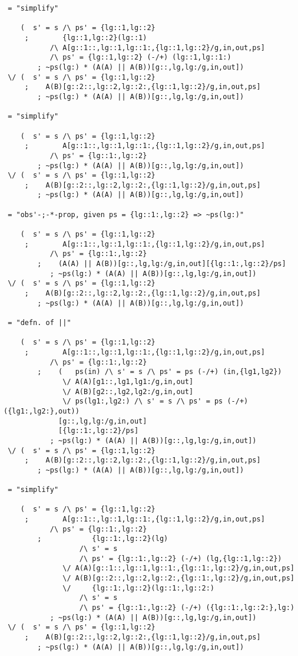 \begin{verbatim}
 = "simplify"

    (  s' = s /\ ps' = {lg::1,lg::2}
     ;        {lg::1,lg::2}(lg::1)
           /\ A[g::1::,lg::1,lg::1:,{lg::1,lg::2}/g,in,out,ps]
           /\ ps' = {lg::1,lg::2} (-/+) (lg::1,lg::1:)
        ; ~ps(lg:) * (A(A) || A(B))[g::,lg,lg:/g,in,out])
 \/ (  s' = s /\ ps' = {lg::1,lg::2}
     ;    A(B)[g::2::,lg::2,lg::2:,{lg::1,lg::2}/g,in,out,ps]
        ; ~ps(lg:) * (A(A) || A(B))[g::,lg,lg:/g,in,out])

 = "simplify"

    (  s' = s /\ ps' = {lg::1,lg::2}
     ;        A[g::1::,lg::1,lg::1:,{lg::1,lg::2}/g,in,out,ps]
           /\ ps' = {lg::1:,lg::2}
        ; ~ps(lg:) * (A(A) || A(B))[g::,lg,lg:/g,in,out])
 \/ (  s' = s /\ ps' = {lg::1,lg::2}
     ;    A(B)[g::2::,lg::2,lg::2:,{lg::1,lg::2}/g,in,out,ps]
        ; ~ps(lg:) * (A(A) || A(B))[g::,lg,lg:/g,in,out])

 = "obs'-;-*-prop, given ps = {lg::1:,lg::2} => ~ps(lg:)"

    (  s' = s /\ ps' = {lg::1,lg::2}
     ;        A[g::1::,lg::1,lg::1:,{lg::1,lg::2}/g,in,out,ps]
           /\ ps' = {lg::1:,lg::2}
        ;    (A(A) || A(B))[g::,lg,lg:/g,in,out][{lg::1:,lg::2}/ps]
           ; ~ps(lg:) * (A(A) || A(B))[g::,lg,lg:/g,in,out])
 \/ (  s' = s /\ ps' = {lg::1,lg::2}
     ;    A(B)[g::2::,lg::2,lg::2:,{lg::1,lg::2}/g,in,out,ps]
        ; ~ps(lg:) * (A(A) || A(B))[g::,lg,lg:/g,in,out])

 = "defn. of ||"

    (  s' = s /\ ps' = {lg::1,lg::2}
     ;        A[g::1::,lg::1,lg::1:,{lg::1,lg::2}/g,in,out,ps]
           /\ ps' = {lg::1:,lg::2}
        ;    (   ps(in) /\ s' = s /\ ps' = ps (-/+) (in,{lg1,lg2})
              \/ A(A)[g1::,lg1,lg1:/g,in,out]
              \/ A(B)[g2::,lg2,lg2:/g,in,out]
              \/ ps(lg1:,lg2:) /\ s' = s /\ ps' = ps (-/+) ({lg1:,lg2:},out))
             [g::,lg,lg:/g,in,out]
             [{lg::1:,lg::2}/ps]
           ; ~ps(lg:) * (A(A) || A(B))[g::,lg,lg:/g,in,out])
 \/ (  s' = s /\ ps' = {lg::1,lg::2}
     ;    A(B)[g::2::,lg::2,lg::2:,{lg::1,lg::2}/g,in,out,ps]
        ; ~ps(lg:) * (A(A) || A(B))[g::,lg,lg:/g,in,out])

 = "simplify"

    (  s' = s /\ ps' = {lg::1,lg::2}
     ;        A[g::1::,lg::1,lg::1:,{lg::1,lg::2}/g,in,out,ps]
           /\ ps' = {lg::1:,lg::2}
        ;            {lg::1:,lg::2}(lg)
                  /\ s' = s
                  /\ ps' = {lg::1:,lg::2} (-/+) (lg,{lg::1,lg::2})
              \/ A(A)[g::1::,lg::1,lg::1:,{lg::1:,lg::2}/g,in,out,ps]
              \/ A(B)[g::2::,lg::2,lg::2:,{lg::1:,lg::2}/g,in,out,ps]
              \/     {lg::1:,lg::2}(lg::1:,lg::2:)
                  /\ s' = s
                  /\ ps' = {lg::1:,lg::2} (-/+) ({lg::1:,lg::2:},lg:)
           ; ~ps(lg:) * (A(A) || A(B))[g::,lg,lg:/g,in,out])
 \/ (  s' = s /\ ps' = {lg::1,lg::2}
     ;    A(B)[g::2::,lg::2,lg::2:,{lg::1,lg::2}/g,in,out,ps]
        ; ~ps(lg:) * (A(A) || A(B))[g::,lg,lg:/g,in,out])


\end{verbatim}

